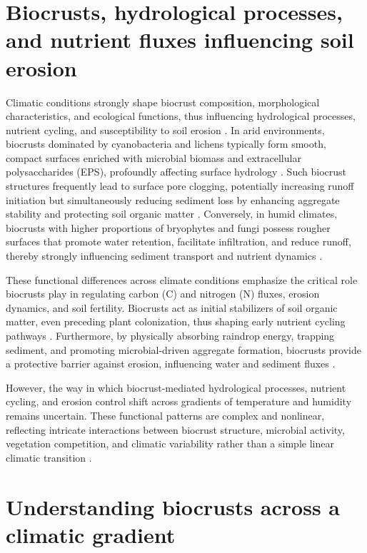 \section{Biocrusts, hydrological processes, and nutrient fluxes influencing soil erosion}
\label{sec:BiocrustFluxes}

Climatic conditions strongly shape biocrust composition, morphological characteristics, and ecological functions, thus influencing hydrological processes, nutrient cycling, and susceptibility to soil erosion \citep{Belnap2003,ConcostrinaZubiri2014}. In arid environments, biocrusts dominated by cyanobacteria and lichens typically form smooth, compact surfaces enriched with microbial biomass and extracellular polysaccharides (EPS), profoundly affecting surface hydrology \citep{RodriguezCaballero2018,Weber2022}. Such biocrust structures frequently lead to surface pore clogging, potentially increasing runoff initiation but simultaneously reducing sediment loss by enhancing aggregate stability and protecting soil organic matter \citep{Kidron2021}. Conversely, in humid climates, biocrusts with higher proportions of bryophytes and fungi possess rougher surfaces that promote water retention, facilitate infiltration, and reduce runoff, thereby strongly influencing sediment transport and nutrient dynamics \citep{RiverasMunoz2022,Seitz2017,Gall2022b}.

These functional differences across climate conditions emphasize the critical role biocrusts play in regulating carbon (C) and nitrogen (N) fluxes, erosion dynamics, and soil fertility. Biocrusts act as initial stabilizers of soil organic matter, even preceding plant colonization, thus shaping early nutrient cycling pathways \citep{Belnap2007,Young2022}. Furthermore, by physically absorbing raindrop energy, trapping sediment, and promoting microbial-driven aggregate formation, biocrusts provide a protective barrier against erosion, influencing water and sediment fluxes \citep{Costa2018,Xiao2022}.

However, the way in which biocrust-mediated hydrological processes, nutrient cycling, and erosion control shift across gradients of temperature and humidity remains uncertain. These functional patterns are complex and nonlinear, reflecting intricate interactions between biocrust structure, microbial activity, vegetation competition, and climatic variability rather than a simple linear climatic transition \citep{Bernhard2018,RiverasMunoz2025}.

\section{Understanding biocrusts across a climatic gradient}
\label{sec:BiocrustClimate}

